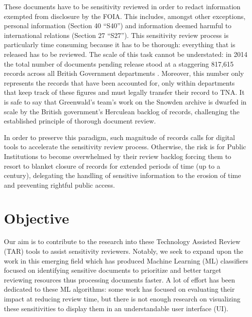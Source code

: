 \documentclass[\version]{l4proj}
\begin{document}
These documents have to be sensitivity reviewed in order to redact information exempted from disclosure by the FOIA.
This includes, amongst other exceptions, personal information (Section 40 ``S40'') and information deemed harmful to international relations (Section 27 ``S27''). %
This sensitivity review process is particularly time consuming because it has to be thorough: everything that is released has to be reviewed.
The scale of this task cannot be understated: in 2014 the total number of documents pending release stood at a staggering 817,615 records across all British Government departments \autocite{allanRecordsReview2014,thenationalarchivesRecordTransferReport2014}.
Moreover, this number only represents the records that have been accounted for, only within departments that keep track of these figures and must legally transfer their record to TNA.
It is safe to say that Greenwald's team's work on the Snowden archive is dwarfed in scale by the British government's Herculean backlog of records, challenging the established principle of thorough document review.

In order to preserve this paradigm, such magnitude of records calls for digital tools to accelerate the sensitivity review process.
Otherwise, the risk is for Public Institutions to become overwhelmed by their review backlog forcing them to resort to blanket closure of records for extended periods of time (up to a century), delegating the handling of sensitive information to the erosion of time and preventing rightful public access.

\section{Objective}

Our aim is to contribute to the research into these Technology Assisted Review (TAR) tools to assist sensitivity reviewers.
Notably, we seek to expand upon the work in this emerging field which has produced Machine Learning (ML) classifiers focused on identifying sensitive documents to prioritize and better target reviewing resources thus processing documents faster.
A lot of effort has been dedicated to these ML algorithms: some work has focused on evaluating their impact at reducing review time, but there is not enough research on visualizing these sensitivities to display them in an understandable user interface (UI).
\end{document}
